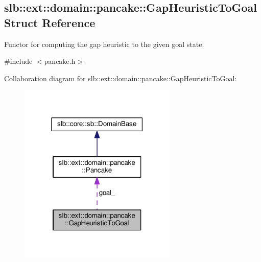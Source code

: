 \hypertarget{structslb_1_1ext_1_1domain_1_1pancake_1_1GapHeuristicToGoal}{}\subsection{slb\+:\+:ext\+:\+:domain\+:\+:pancake\+:\+:Gap\+Heuristic\+To\+Goal Struct Reference}
\label{structslb_1_1ext_1_1domain_1_1pancake_1_1GapHeuristicToGoal}


Functor for computing the gap heuristic to the given goal state.  




{\ttfamily \#include $<$pancake.\+h$>$}



Collaboration diagram for slb\+:\+:ext\+:\+:domain\+:\+:pancake\+:\+:Gap\+Heuristic\+To\+Goal\+:\nopagebreak
\begin{figure}[H]
\begin{center}
\leavevmode
\includegraphics[width=213pt]{structslb_1_1ext_1_1domain_1_1pancake_1_1GapHeuristicToGoal__coll__graph}
\end{center}
\end{figure}
